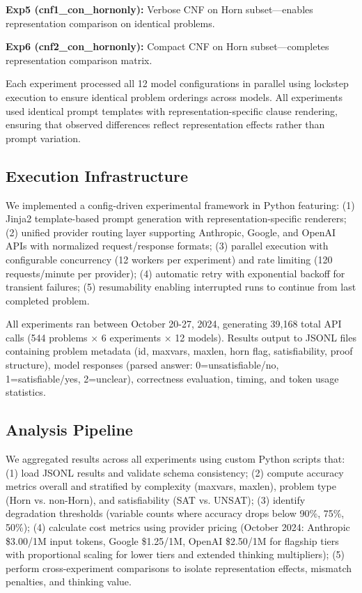 \documentclass[pdflatex,sn-mathphys-num]{sn-jnl}%
\theoremstyle{thmstyleone}%
\theoremstyle{thmstyletwo}%
\theoremstyle{thmstylethree}%
\begin{document}
\textbf{Exp5 (cnf1\_con\_hornonly):} Verbose CNF on Horn subset—enables representation comparison on identical problems.

\textbf{Exp6 (cnf2\_con\_hornonly):} Compact CNF on Horn subset—completes representation comparison matrix.

Each experiment processed all 12 model configurations in parallel using lockstep execution to ensure identical problem orderings across models. All experiments used identical prompt templates with representation-specific clause rendering, ensuring that observed differences reflect representation effects rather than prompt variation.

\subsection{Execution Infrastructure}\label{subsec:infrastructure}

We implemented a config-driven experimental framework in Python featuring: (1) Jinja2 template-based prompt generation with representation-specific renderers; (2) unified provider routing layer supporting Anthropic, Google, and OpenAI APIs with normalized request/response formats; (3) parallel execution with configurable concurrency (12 workers per experiment) and rate limiting (120 requests/minute per provider); (4) automatic retry with exponential backoff for transient failures; (5) resumability enabling interrupted runs to continue from last completed problem.

All experiments ran between October 20-27, 2024, generating 39,168 total API calls (544 problems × 6 experiments × 12 models). Results output to JSONL files containing problem metadata (id, maxvars, maxlen, horn flag, satisfiability, proof structure), model responses (parsed answer: 0=unsatisfiable/no, 1=satisfiable/yes, 2=unclear), correctness evaluation, timing, and token usage statistics.

\subsection{Analysis Pipeline}\label{subsec:analysis}

We aggregated results across all experiments using custom Python scripts that: (1) load JSONL results and validate schema consistency; (2) compute accuracy metrics overall and stratified by complexity (maxvars, maxlen), problem type (Horn vs. non-Horn), and satisfiability (SAT vs. UNSAT); (3) identify degradation thresholds (variable counts where accuracy drops below 90\%, 75\%, 50\%); (4) calculate cost metrics using provider pricing (October 2024: Anthropic \$3.00/1M input tokens, Google \$1.25/1M, OpenAI \$2.50/1M for flagship tiers with proportional scaling for lower tiers and extended thinking multipliers); (5) perform cross-experiment comparisons to isolate representation effects, mismatch penalties, and thinking value.
\end{document}
